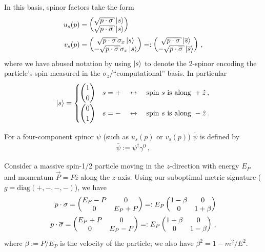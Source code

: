 \begin{subappendices}
In this basis, spinor factors take the form
\begin{subequations}
\begin{align}
    \label{eq:bispinor-u}
    u_s(p)
    &=
    \pmtrx{
        \sqrt{p\cdot \sigma}\ket{s}
        \\
        \sqrt{p\cdot{\overline{\sigma}}} \ket{s}
    }
    \\
    \label{eq:bispinor-v}
    v_s(p)
    &=
    \pmtrx{
        \sqrt{p\cdot \sigma}\sigma_x \ket{s}
        \\
        -\sqrt{p\cdot{\overline{\sigma}}} \sigma_x \ket{s}
    }
    =:
    \pmtrx{
        \sqrt{p\cdot \sigma}\ket{\overline{s}}
        \\
        -\sqrt{p\cdot{\overline{\sigma}}} \ket{\overline{s}}
    }
    \,,
\end{align}
\end{subequations}
where we have abused notation by using \(\ket{s}\) to denote the 2-spinor encoding the particle's spin measured in the \(\sigma_z\)/``computational'' basis.
%
In particular
\begin{align}
    \ket{s}
    =
    \begin{cases}
        \begin{pmatrix}1\\0\end{pmatrix}
        &
        s = +
        \quad \leftrightarrow \quad
        \text{spin } s \text{ is along } +\hat{z}
        \,,
        \\
        \begin{pmatrix}0\\1\end{pmatrix}
        &
        s = -
        \quad \leftrightarrow \quad
        \text{spin } s \text{ is along } -\hat{z}
        \,.
    \end{cases}
\end{align}

For a four-component spinor \(\psi\) (such as \(u_s(p)\) or \(v_s(p)\)) \(\bar{\psi}\) is defined by
\begin{align}
    \bar{\psi} := \psi^\dagger \gamma^0
    \,,
\end{align}


\begin{example}
    \label{eq:massive-bispinor}
    Consider a massive spin-1/2 particle moving in the \(z\)-direction with energy \(E_P\) and momentum \(\vec{P} = P \hat{z}\) along the \(z\)-axis.
    Using our suboptimal metric signature (\(g = \text{diag}(+,-,-,-)\)), we have
    \begin{align}
        p\cdot \sigma
        =
        \begin{pmatrix}E_P - P & 0 \\ 0 & E_P + P\end{pmatrix}
        =:
        E_P \begin{pmatrix}1 - \beta & 0 \\ 0 & 1 + \beta\end{pmatrix}
        \\
        p\cdot \overline{\sigma}
        =
        \begin{pmatrix}E_P + P & 0 \\ 0 & E_P - P\end{pmatrix}
        =:
        E_P \begin{pmatrix}1 + \beta & 0 \\ 0 & 1 - \beta\end{pmatrix}
        \,,
    \end{align}
    where \(\beta := P / E_P\) is the velocity of the particle;
    we also have \(\beta^2 = 1 - m^2/E^2\).


\end{example}
\end{subappendices}
